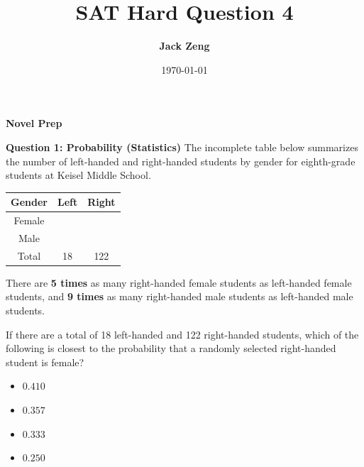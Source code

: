 \documentclass{beamer}
\title[SAT Hard Question]{\textbf{SAT Hard Question 4}}
\author{\textbf{Jack Zeng}}
\institute{\textcolor{white}{\textbf{Novel Prep}}}
\date{\today}
\begin{document}
\begin{frame}
    \titlepage
    \vfill
    \begin{flushright}
        \textcolor{purpleblue}{\Huge \textbf{Novel Prep}}
    \end{flushright}
\end{frame}


\begin{frame}
\end{frame}

\begin{frame}{\textbf{Question 1: Probability (Statistics)}}
\small
The incomplete table below summarizes the number of left-handed and right-handed students by gender for eighth-grade students at Keisel Middle School.

\begin{center}
\begin{tabular}{|c|c|c|}
\hline
\textbf{Gender} & \textbf{Left} & \textbf{Right} \\
\hline
Female &  &  \\
\hline
Male &  &  \\
\hline
Total & 18 & 122 \\
\hline
\end{tabular}
\end{center}

There are \textbf{5 times} as many right-handed female students as left-handed female students, and \textbf{9 times} as many right-handed male students as left-handed male students.

If there are a total of 18 left-handed and 122 right-handed students, which of the following is closest to the probability that a randomly selected right-handed student is female?

\begin{itemize}
    \item[A.] \( 0.410 \)
    \item[B.] \( 0.357 \)
    \item[C.] \( 0.333 \)
    \item[D.] \( 0.250 \)
\end{itemize}
\end{frame}
\end{document}
